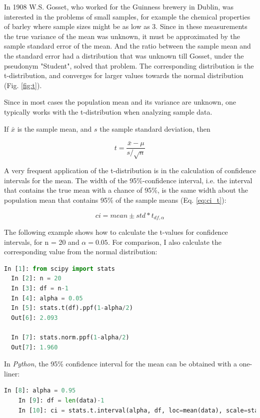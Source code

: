 In 1908 W.S. Gosset, who worked for the Guinness brewery in Dublin, was interested in the problems of small samples, for example the chemical properties of barley where sample sizes might be as low as 3. Since in these measurements the true variance of the mean was unknown, it must be approximated by the sample standard error of the mean. And the ratio between the sample mean and the standard error had a distribution that was unknown till Gosset, under the  pseudonym "Student", solved that problem.
The corresponding distribution is the t-distribution, and converges for larger values towards the normal distribution (Fig. \ref{fig:t}).

Since in most cases the population mean and its variance are unknown, one typically works with the t-distribution when analyzing sample data.

If $\bar{x}$ is the sample mean, and $s$ the sample standard deviation, then

\begin{equation}
  t = \frac{\bar{x}-\mu}{s/ \sqrt{n}}
\end{equation}\label{eq:Tdistribution}

A very frequent application of the t-distribution is in the calculation of confidence intervals for the mean. The width of the 95\%-confidence interval, i.e. the interval that contains the true mean with a chance of 95\%, is the same width about the population mean that contains 95\% of the sample means (Eq. \ref{eq:ci_t}):

\begin{equation}
  ci = mean \pm std * t_{df,\alpha}
\end{equation}\label{eq:ci_t}

The following example shows how to calculate the t-values for confidence intervals, for n = 20 and $\alpha=0.05$. For comparison, I also calculate the corresponding value from the normal distribution:

\begin{lstlisting}[language=Python]
  In [1]: from scipy import stats
  In [2]: n = 20
  In [3]: df = n-1
  In [4]: alpha = 0.05
  In [5]: stats.t(df).ppf(1-alpha/2)
  Out[6]: 2.093

  In [7]: stats.norm.ppf(1-alpha/2)
  Out[7]: 1.960
\end{lstlisting}


In \emph{Python}, the 95\% confidence interval for the mean can be obtained with a one-liner:

\begin{lstlisting}[language=Python]
    In [8]: alpha = 0.95
    In [9]: df = len(data)-1
    In [10]: ci = stats.t.interval(alpha, df, loc=mean(data), scale=stats.sem(data))
\end{lstlisting}

